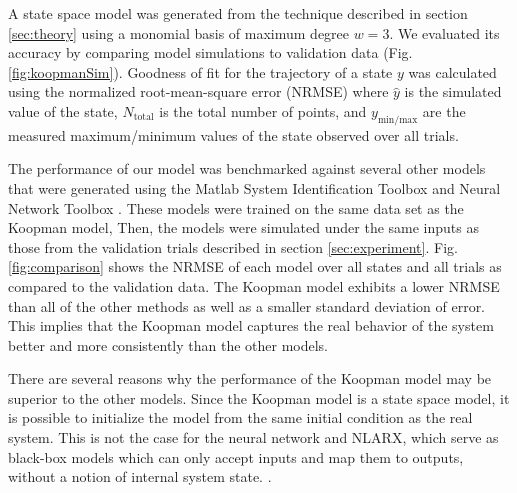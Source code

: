 A state space model was generated from the technique described in section \ref{sec:theory} using a monomial basis of maximum degree $w=3$.
We evaluated its accuracy by comparing model simulations to validation data (Fig. \ref{fig:koopmanSim}).
Goodness of fit for the trajectory of a state $y$ was calculated using the normalized root-mean-square error (NRMSE)
where $\hat{y}$ is the simulated value of the state, $N_\text{total}$ is the total number of points, and $y_{\text{min/max}}$ are the measured maximum/minimum values of the state observed over all trials.

The performance of our model was benchmarked against several other models that were generated using the Matlab System Identification Toolbox and Neural Network Toolbox \cite{MATLAB:2017}.
These models were trained on the same data set as the Koopman model, 
Then, the models were simulated under the same inputs as those from the validation trials described in section \ref{sec:experiment}.
Fig. \ref{fig:comparison} shows the NRMSE of each model over all states and all trials as compared to the validation data.
The Koopman model exhibits a lower NRMSE than all of the other methods as well as a smaller standard deviation of error.
This implies that the Koopman model captures the real behavior of the system better and more consistently than the other models.

There are several reasons why the performance of the Koopman model may be superior to the other models.
Since the Koopman model is a state space model, it is possible to initialize the model from the same initial condition as the real system.
This is not the case for the neural network and NLARX, which serve as black-box models which can only accept inputs and map them to outputs, without a notion of internal system state.
.

